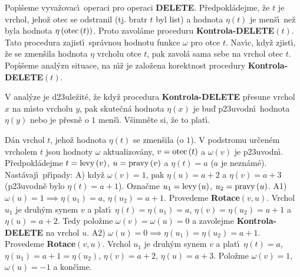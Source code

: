 \flushpar Pop\'\i\v seme vyva\v zovac\'\i\ operaci pro operaci 
{\bf DELETE}.  P\v red\-po\-kl\'adejme, \v ze $t$ je vrchol, jeho\v z otec se 
odstranil (tj.  bratr $t$ byl list) a hodnota $\eta \left(t\right)$ je men\v s\'\i\ 
ne\v z byla hodnota $\eta \left(\operatorname{otec}\left(t\right)\right)$.  Proto zavol\'ame proceduru 
{\bf Kontrola-DELETE$\left(t\right)$}.  Tato procedura zajist\'\i\ spr\'avnou 
hodnotu funkce $\omega$ pro otce $t$.  Nav\'\i c, kdy\v z zjist\'\i , \v ze se 
zmen\v sila hodnota $\eta$ vrcholu otce $t$, pak zavol\'a sama sebe 
na vrchol otec $t$. Pop\'\i\v seme anal\'yzu situace, na n\'\i\v z je 
zalo\v zena korektnost procedury {\bf Kontrola-DELETE$\left(t\right)$}.  
\medskip

\flushpar V anal\'yze je d\accent23ule\v zit\'e, \v ze kdy\v z procedura {\bf Kontrola-DELETE }
p\v resune vrchol $x$ na m\'\i sto vrcholu $y$, pak skute\v cn\'a hodnota $
\eta \left(x\right)$ 
je bu\v d p\accent23uvodn\'\i\ hodnota $\eta \left(y\right)$ nebo je p\v resn\v e o $
1$ men\v s\'\i . V\v simn\v ete si, \v ze to plat\'\i . 
\medskip

\flushpar D\'an vrchol $t$, jeho\v z hodnota $\eta \left(t\right)$ se zmen\v sila (o $
1$).  V 
podstromu ur\v cen\'em vrcholem $t$ jsou hodnoty $\omega$ aktualizov\'any, 
$v=\operatorname{otec}\left(t\right)$ a $\omega \left(v\right)$ je p\accent23uvodn\'\i .  P\v redpokl\'adejme 
$t=\operatorname{levy}\left(v\right)$, $u=\operatorname{pravy}\left(v\right)$ a $\eta \left(t\right)=a$ ($a$ je nezn\'am\'e).  Nast\'avaj\'\i\ 
p\v r\'\i pady:\newline 
A) kdy\v z $\omega \left(v\right)=1$, pak $\eta \left(u\right)=a+2$ a $\eta \left(v\right)=a+3$ (p\accent23uvodn\v e 
bylo $\eta \left(t\right)=a+1$).  Ozna\v cme $u_1=\operatorname{levy}\left(u\right)$, $u_2=\operatorname{pravy}\left(u\right)$.\newline 
A1) $\omega \left(u\right)=1\implies\eta \left(u_1\right)=a,\,\eta \left(u_2\right)=a+1$.  Provedeme 
{\bf Rotace$\left(v,u\right)$}.  
Vrchol $u_1$ je druh\'ym synem $v$ a plat\'\i\ $\eta \left(t\right)=\eta \left(u_
1\right)=a$, 
$\eta \left(v\right)=\eta \left(u_2\right)=a+1$ a $\eta \left(u\right)=a+2$.  Tedy polo\v zme $\omega 
\left(v\right)=\omega \left(u\right)=0$ a 
zavolejme {\bf Kontrola-DELETE} na vrchol $u$.\newline 
A2) $\omega \left(u\right)=0\implies\eta \left(u_1\right)=\eta \left(u_2\right)=a+1$. Provedeme 
{\bf Rotace$\left(v,u\right)$}. Vrchol $u_1$ je druh\'ym synem $v$ a plat\'\i\ 
$\eta \left(t\right)=a$, $\eta \left(u_1\right)=a+1=\eta \left(u_2\right)$, $\eta \left(v\right)=a+2$, $\eta 
\left(u\right)=a+3$. Polo\v zme 
$\omega \left(v\right)=1$, $\omega \left(u\right)=-1$ a kon\v c\'\i me.
\medskip
 
